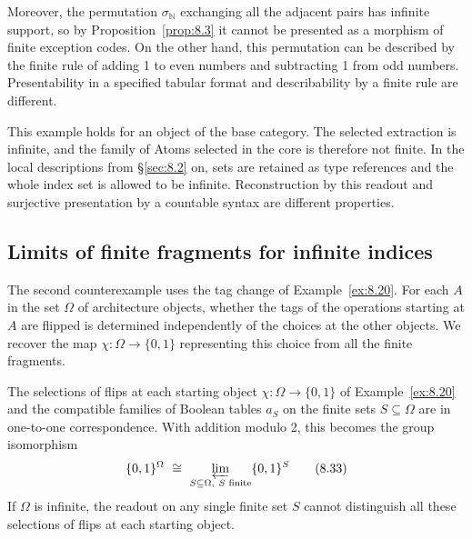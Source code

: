 Moreover, the permutation $\sigma_{\mathbb{N}}$ exchanging all the adjacent pairs has infinite
support, so by Proposition~\ref{prop:8.3} it cannot be presented as a morphism of finite
exception codes.
On the other hand, this permutation can be described by the finite rule of adding 1 to even
numbers and subtracting 1 from odd numbers.
Presentability in a specified tabular format and describability by a finite rule are different.

This example holds for an object of the base category. The selected extraction is infinite, and the family of Atoms selected in the core is
therefore not finite.
In the local descriptions from \S\ref{sec:8.2} on, sets are retained as type references and the
whole index set is allowed to be infinite.
Reconstruction by this readout and surjective presentation by a countable syntax are different
properties.

\subsection*{Limits of finite fragments for infinite indices}

The second counterexample uses the tag change of Example~\ref{ex:8.20}.
For each $A$ in the set $\Omega$ of architecture objects, whether the tags of the operations
starting at $A$ are flipped is determined independently of the choices at the other objects.
We recover the map $\chi:\Omega\to\{0,1\}$ representing this choice from all the finite
fragments.

\begin{proposition}\label{prop:8.33}

The selections of flips at each starting object $\chi:\Omega\to\{0,1\}$ of Example~\ref{ex:8.20} and the
compatible families of Boolean tables $a_S$ on the finite sets $S\subseteq\Omega$ are in
one-to-one correspondence.
With addition modulo 2, this becomes the group isomorphism
\begin{equation*}
\{0,1\}^{\Omega}
\ \cong\
\varprojlim_{S\subseteq\Omega,\ S\text{ finite}}\{0,1\}^{S}
\tag{8.33}\label{eq:8.33}
\end{equation*}
If $\Omega$ is infinite, the readout on any single finite set $S$ cannot distinguish all these
selections of flips at each starting object.

\end{proposition}

